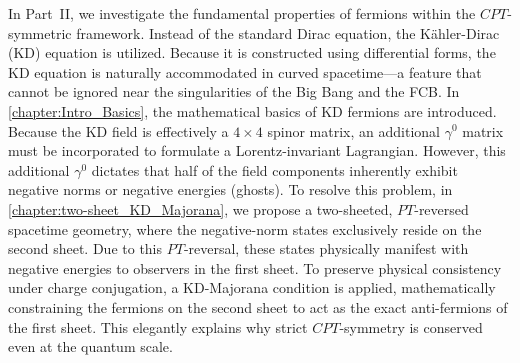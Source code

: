 \documentclass[12pt,a4paper]{report}
\begin{document}
In Part~II, we investigate the fundamental properties of fermions within the $CPT$-symmetric framework. Instead of the standard Dirac equation, the K\"{a}hler-Dirac (KD) equation is utilized. Because it is constructed using differential forms, the KD equation is naturally accommodated in curved spacetime---a feature that cannot be ignored near the singularities of the Big Bang and the FCB. In \cref{chapter:Intro_Basics}, the mathematical basics of KD fermions are introduced. Because the KD field is effectively a $4\times 4$ spinor matrix, an additional $\gamma^0$ matrix must be incorporated to formulate a Lorentz-invariant Lagrangian. However, this additional $\gamma^0$ dictates that half of the field components inherently exhibit negative norms or negative energies (ghosts). To resolve this problem, in \cref{chapter:two-sheet_KD_Majorana}, we propose a two-sheeted, $PT$-reversed spacetime geometry, where the negative-norm states exclusively reside on the second sheet. Due to this $PT$-reversal, these states physically manifest with negative energies to observers in the first sheet. To preserve physical consistency under charge conjugation, a KD-Majorana condition is applied, mathematically constraining the fermions on the second sheet to act as the exact anti-fermions of the first sheet. This elegantly explains why strict $CPT$-symmetry is conserved even at the quantum scale.
\end{document}
